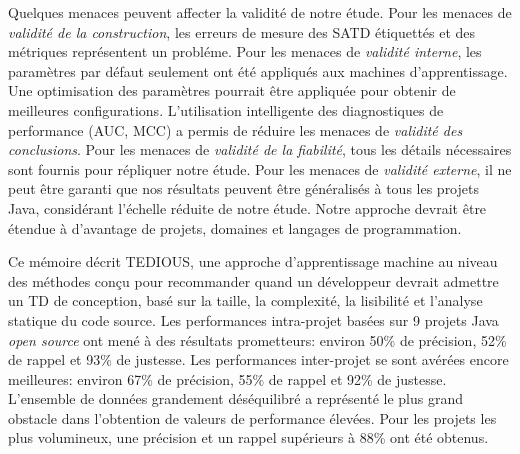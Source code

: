 Quelques menaces peuvent affecter la validit\'{e} de notre \'{e}tude. Pour les menaces de \emph{validit\'{e} de la construction}, les erreurs de mesure des SATD \'{e}tiquett\'{e}s et des m\'{e}triques repr\'{e}sentent un probl\'{e}me. Pour les menaces de \emph{validit\'{e} interne}, les param\`{e}tres par d\'{e}faut seulement ont \'{e}t\'{e} appliqu\'{e}s aux machines d'apprentissage. Une optimisation des param\`{e}tres pourrait \^{e}tre appliqu\'{e}e pour obtenir de meilleures configurations. L'utilisation intelligente des diagnostiques de performance (\ac{AUC}, \ac{MCC}) a permis de r\'{e}duire les menaces de \emph{validit\'{e} des conclusions}. Pour les menaces de \emph{validit\'{e} de la fiabilit\'{e}}, tous les d\'{e}tails n\'{e}cessaires sont fournis pour r\'{e}pliquer notre \'{e}tude. Pour les menaces de \emph{validit\'{e} externe}, il ne peut \^{e}tre garanti que nos r\'{e}sultats peuvent \^{e}tre g\'{e}n\'{e}ralis\'{e}s \`{a} tous les projets Java, consid\'{e}rant l'\'{e}chelle r\'{e}duite de notre \'{e}tude. Notre approche devrait \^{e}tre \'{e}tendue \`{a} d'avantage de projets, domaines et langages de programmation. \par

Ce m\'{e}moire d\'{e}crit \ac{TEDIOUS}, une approche d'apprentissage machine au niveau des m\'{e}thodes con\c{c}u pour recommander quand un d\'{e}veloppeur devrait admettre un \ac{TD} de conception, bas\'{e} sur la taille, la complexit\'{e}, la lisibilit\'{e} et l'analyse statique du code source. Les performances intra-projet bas\'{e}es sur 9 projets Java \emph{open source} ont men\'{e} \`{a} des r\'{e}sultats prometteurs: environ 50\% de pr\'{e}cision, 52\% de rappel et 93\% de justesse. Les performances inter-projet se sont av\'{e}r\'{e}es encore meilleures: environ 67\% de pr\'{e}cision, 55\% de rappel et 92\% de justesse. L'ensemble de donn\'{e}es grandement d\'{e}s\'{e}quilibr\'{e} a repr\'{e}sent\'{e} le plus grand obstacle dans l'obtention de valeurs de performance \'{e}lev\'{e}es. Pour les projets les plus volumineux, une pr\'{e}cision et un rappel sup\'{e}rieurs \`{a} 88\% ont \'{e}t\'{e} obtenus. \par

